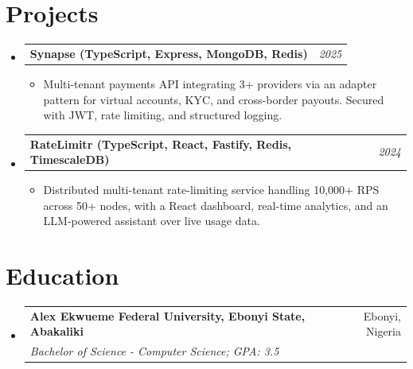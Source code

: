 \documentclass[a4paper]{article}
\makeatletter
\newcommand{\resumeSubheading}[4]{
\vspace{-1pt}
\item[]
\begin{tabular*}{0.97\textwidth}{l@{\extracolsep{\fill}}r}
	\textbf{#1} & #2          \\
	\textit{#3} & \textit{#4} \\
\end{tabular*}
\vspace{1pt}
}
\newcommand{\resumeProjectHeading}[2]{ %
\vspace{2pt}
\item[]
\begin{tabular*}{0.97\textwidth}{l@{\extracolsep{\fill}}r}
	\textbf{#1} & \textit{#2} \\
\end{tabular*}
\vspace{0pt}
}
\newcommand{\resumeSubHeadingListStart}{\begin{itemize}[leftmargin=*,topsep=1pt]}
\newcommand{\resumeSubHeadingListEnd}{\end{itemize}}
\newcommand{\resumeItemListStart}{\begin{itemize}[topsep=0pt,itemsep=0pt,parsep=0pt]}
\newcommand{\resumeItemListEnd}{\end{itemize}}
\makeatother
\begin{document}
	\section{Projects}
	\resumeSubHeadingListStart
	\resumeProjectHeading{Synapse (TypeScript, Express, MongoDB, Redis)}{2025}
	\resumeItemListStart
	\item\small{Multi-tenant payments API integrating 3+ providers via an adapter pattern for virtual accounts, KYC, and cross-border payouts. Secured with JWT, rate limiting, and structured logging.}
	\resumeItemListEnd
	\resumeProjectHeading{RateLimitr (TypeScript, React, Fastify, Redis, TimescaleDB)}{2024}
	\resumeItemListStart
	\item\small{Distributed multi-tenant rate-limiting service handling 10,000+ RPS across 50+ nodes, with a React dashboard, real-time analytics, and an LLM-powered assistant over live usage data.}
	\resumeItemListEnd
	\resumeSubHeadingListEnd

	\section{Education}
	\resumeSubHeadingListStart
	\resumeSubheading
	{Alex Ekwueme Federal University, Ebonyi State, Abakaliki}{Ebonyi, Nigeria}
	{Bachelor of Science - Computer Science; GPA: 3.5}{}
	\resumeSubHeadingListEnd
\end{document}
